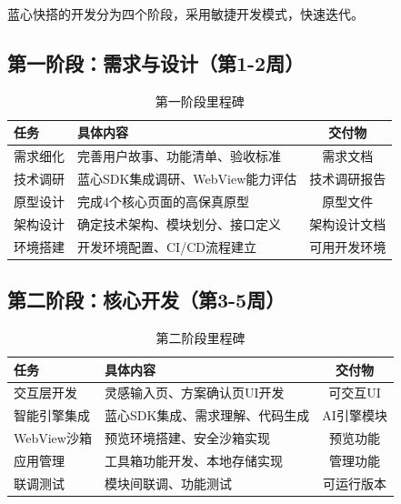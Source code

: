 \documentclass[a4paper,12pt]{ctexart}
\begin{document}
蓝心快搭的开发分为四个阶段，采用敏捷开发模式，快速迭代。

\subsection{第一阶段：需求与设计（第1-2周）}

\begin{table}[H]
    \centering
    \caption{第一阶段里程碑}
    \begin{tabularx}{\textwidth}{|l|X|c|}
        \hline
        \textbf{任务} & \textbf{具体内容} & \textbf{交付物} \\
        \hline
        需求细化 & 完善用户故事、功能清单、验收标准 & 需求文档 \\
        \hline
        技术调研 & 蓝心SDK集成调研、WebView能力评估 & 技术调研报告 \\
        \hline
        原型设计 & 完成4个核心页面的高保真原型 & 原型文件 \\
        \hline
        架构设计 & 确定技术架构、模块划分、接口定义 & 架构设计文档 \\
        \hline
        环境搭建 & 开发环境配置、CI/CD流程建立 & 可用开发环境 \\
        \hline
    \end{tabularx}
\end{table}

\subsection{第二阶段：核心开发（第3-5周）}

\begin{table}[H]
    \centering
    \caption{第二阶段里程碑}
    \begin{tabularx}{\textwidth}{|l|X|c|}
        \hline
        \textbf{任务} & \textbf{具体内容} & \textbf{交付物} \\
        \hline
        交互层开发 & 灵感输入页、方案确认页UI开发 & 可交互UI \\
        \hline
        智能引擎集成 & 蓝心SDK集成、需求理解、代码生成 & AI引擎模块 \\
        \hline
        WebView沙箱 & 预览环境搭建、安全沙箱实现 & 预览功能 \\
        \hline
        应用管理 & 工具箱功能开发、本地存储实现 & 管理功能 \\
        \hline
        联调测试 & 模块间联调、功能测试 & 可运行版本 \\
        \hline
    \end{tabularx}
\end{table}
\end{document}
